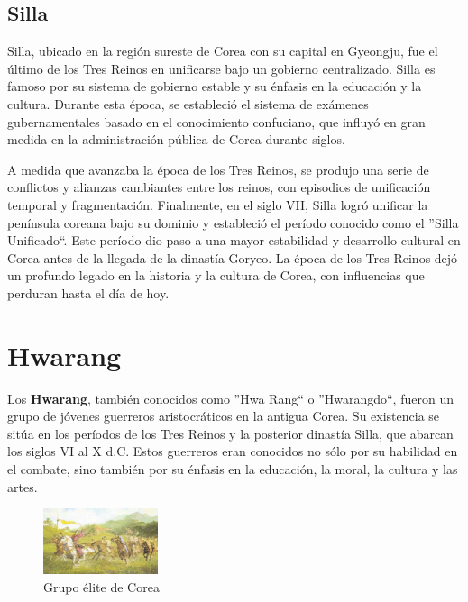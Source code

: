\subsection{Silla}

Silla, ubicado en la región sureste de Corea con su capital en Gyeongju, fue el último de los Tres Reinos en unificarse bajo un gobierno centralizado. Silla es famoso por su sistema de gobierno estable y su énfasis en la educación y la cultura. Durante esta época, se estableció el sistema de exámenes gubernamentales basado en el conocimiento confuciano, que influyó en gran medida en la administración pública de Corea durante siglos.

A medida que avanzaba la época de los Tres Reinos, se produjo una serie de conflictos y alianzas cambiantes entre los reinos, con episodios de unificación temporal y fragmentación. Finalmente, en el siglo VII, Silla logró unificar la península coreana bajo su dominio y estableció el período conocido como el ''Silla Unificado``. Este período dio paso a una mayor estabilidad y desarrollo cultural en Corea antes de la llegada de la dinastía Goryeo. La época de los Tres Reinos dejó un profundo legado en la historia y la cultura de Corea, con influencias que perduran hasta el día de hoy.

\section{Hwarang}

Los \textbf{Hwarang}, también conocidos como ''Hwa Rang`` o ''Hwarangdo\textregistered``, fueron un grupo de jóvenes guerreros aristocráticos en la antigua Corea. Su existencia se sitúa en los períodos de los Tres Reinos y la posterior dinastía Silla, que abarcan los siglos VI al X d.C. Estos guerreros eran conocidos no sólo por su habilidad en el combate, sino también por su énfasis en la educación, la moral, la cultura y las artes.

\begin{figure}[h]
	\centering
	\includegraphics[width=0.3\textwidth]{images/Historia/pintura_hrd.jpg} %
	\caption{Grupo élite de Corea}
\end{figure}


